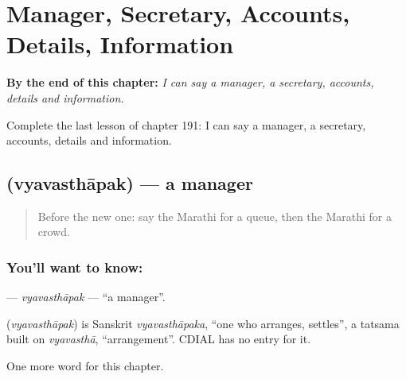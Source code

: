 
\chapter{Manager, Secretary, Accounts, Details, Information}
\label{ch:mr-manager-secretary-accounts-details-information}

\begin{chapteropening}
\textbf{By the end of this chapter:} \emph{I can say a manager, a secretary, accounts, details and information.}

Complete the last lesson of chapter 191: I can say a manager, a secretary, accounts, details and information.
\end{chapteropening}

\section[\texorpdfstring{\mr{व्यवस्थापक} (vyavasthāpak)}{व्यवस्थापक (vyavasthāpak)}]{ (vyavasthāpak) — a manager}

\label{lesson:MR-C191-vyavasthapak}



\begin{quote}
Before the new one: say the Marathi for a queue, then the Marathi for a crowd.
\end{quote}

\subsection*{You'll want to know: }
\textbf{} — \emph{vyavasthāpak} — \textquotedblleft{}a manager\textquotedblright{}.

\begin{cousinweb}
\textbf{} (\emph{vyavasthāpak}) is Sanskrit \emph{vyavasthāpaka}, \textquotedblleft{}one who arranges, settles\textquotedblright{}, a tatsama built on \emph{vyavasthā}, \textquotedblleft{}arrangement\textquotedblright{}. CDIAL has no entry for it.
\end{cousinweb}

\begin{grammarlens}[title={What you've built}]
One more word for this chapter.
\end{grammarlens}

